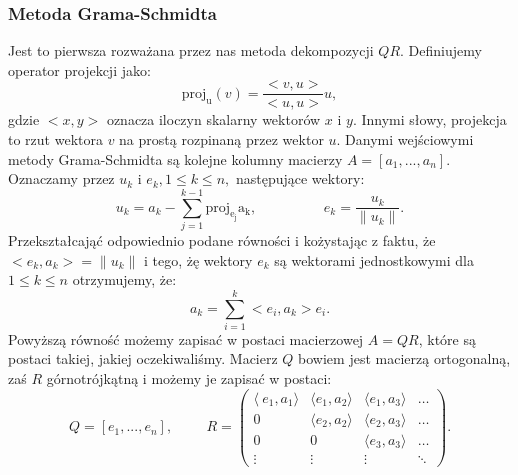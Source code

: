 \subsubsection{Metoda Grama-Schmidta}
Jest to pierwsza rozważana przez nas metoda dekompozycji $QR$. Definiujemy
operator projekcji jako:
$$\mathrm{proj_u}(v)=\frac{<v,u>}{<u,u>}u,$$
gdzie $<x,y>$ oznacza iloczyn skalarny wektorów $x$ i $y$. Innymi słowy, projekcja
to rzut wektora $v$ na prostą rozpinaną przez wektor $u$. Danymi wejściowymi
metody Grama-Schmidta są kolejne kolumny macierzy $A=[a_1,...,a_n]$.
Oznaczamy przez ${u_k}$ i ${e_k}, 1 \leq k \leq n,$ następujące wektory:
$$ u_k = a_k-\sum_{j=1}^{k-1} \mathrm{proj_{e_j}a_k}, \hspace{2cm}
e_k = \frac{u_k}{\|u_k\|}.$$
Przekształcająć odpowiednio podane równości i kożystając z faktu, że
$<e_k, a_k> = \|u_k\|$ i tego, żę wektory $e_k$ są wektorami jednostkowymi dla
$1 \leq k \leq n$ otrzymujemy, że:
$$ a_k = \sum_{i=1}^{k} <e_i,a_k>e_i.$$
Powyższą równość możemy zapisać w postaci macierzowej $A=QR$, które są
postaci takiej, jakiej oczekiwaliśmy. Macierz $Q$ bowiem jest macierzą ortogonalną,
zaś $R$ górnotrójkątną i możemy je zapisać w postaci:
$$ Q = [e_1,...,e_n], \hspace{1cm} R = \begin{pmatrix} \langle\ e_1,a_1
\rangle & \langle e_1,a_2\rangle & \langle e_1, a_3\rangle & \ldots \\ 0
& \langle e_2, a_2\rangle & \langle e_2, a_3\rangle & \ldots \\ 0 & 0 &
\langle e_3, a_3\rangle & \ldots \\ \vdots & \vdots & \vdots & \ddots
\end{pmatrix}.$$
